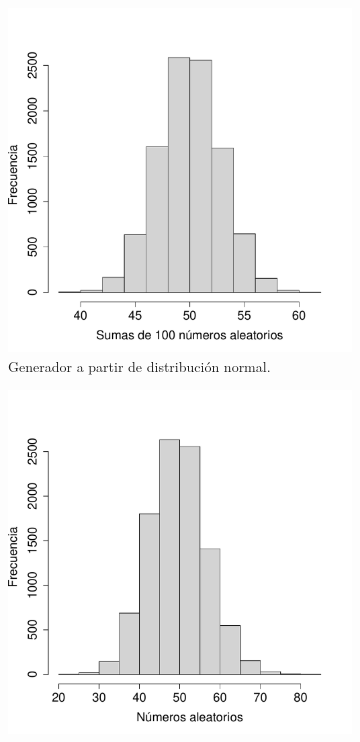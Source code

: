 \documentclass[paper=leter, fontsize=11pt]{scrartcl}
\numberwithin{equation}{section}		%
\numberwithin{figure}{section}			%
\numberwithin{table}{section}				%
\begin{document}
\begin{figure}
    \begin{subfigure}{.5\textwidth}
        \centering
        \includegraphics[scale=0.4]{unif.pdf}
        \caption{Generador a partir de distribución normal.}
        \label{unif_izq}
    \end{subfigure}
    \begin{subfigure}{0.5\textwidth}
        \centering
        \includegraphics[scale=0.4]{unif_poisson.pdf}

\end{subfigure}
\end{figure}
\end{document}
